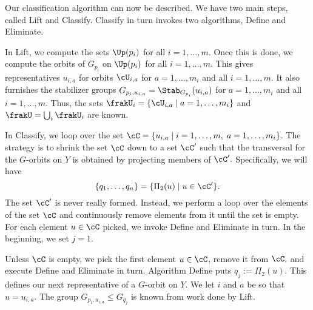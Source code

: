 \bigskip



Our classification algorithm can now be described. 
We have two main steps, called 
{\sc Lift} and {\sc Classify}. 
{\sc Classify} in turn invokes two algorithms, {\sc Define} and {\sc Eliminate}. 

\bigskip

In {\sc Lift}, we compute the sets $\Up(p_i)$ for all $i=1,\ldots,m.$ 
Once this is done, we compute the orbits of $G_{p_i}$ on $\Up(p_i)$ for all $i=1,\ldots,m.$ 
This gives representatives $u_{i,a}$ for orbits 
$\cU_{i,a}$ for $a=1,\ldots, m_i$ and all $i=1, \ldots, m.$ 
It also furnishes the stabilizer groups 
$G_{p_i,u_{i,a}} = \Stab_{G_{p_i}}(u_{i,a})$ for $a=1,\ldots, m_i$ and all $i=1, \ldots, m.$ 
Thus, the sets $\frakU_i = \{ \cU_{i,a} \mid a = 1,\ldots, m_i \}$ 
and $\frakU = \bigcup_i \frakU_i$ are known.


\bigskip

In {\sc Classify},
we loop over the set $\cC = \{ u_{i,a} \mid i=1,\ldots,m, \; a=1,\ldots, m_i \}$.
The strategy is to shrink the set $\cC$ down to a set $\cC'$ such that the 
transversal for the $G$-orbits on $Y$ 
is obtained by projecting members of $\cC'.$
Specifically, we will have  
$$\{q_1,\ldots,q_n\} = \{ \Pi_2(u) \mid u \in \cC' \}.
$$ 
The set $\cC'$ is never really formed. 
Instead, we perform a loop over the elements of the 
set $\cC$ 
and continuously remove elements from it until the set is empty.
For each element $u \in \cC$ picked, we invoke 
{\sc Define} and {\sc Eliminate} in turn.
In the beginning, we set $j = 1.$

\bigskip

Unless $\cC$ is empty, we pick the first element $u \in \cC$, remove it from $\cC,$ and execute 
{\sc Define} and {\sc Eliminate} in turn. 
Algorithm {\sc Define} puts
$q_j := \Pi_2(u).$
This defines our next representative of a $G$-orbit on $Y.$ 
We let $i$ and $a$ be so that $u = u_{i,a}.$ 
The group $G_{p_i,u_{i,a}} \le G_{q_j}$ is known from work done by {\sc Lift}.

\bigskip


